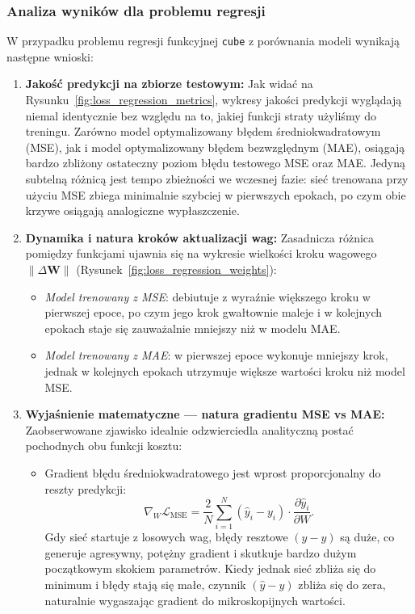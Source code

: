\documentclass[11pt,a4paper]{article}
\begin{document}
\subsubsection{Analiza wyników dla problemu regresji}
W przypadku problemu regresji funkcyjnej \texttt{cube} z porównania modeli wynikają następne wnioski:
\begin{enumerate}
    \item \textbf{Jakość predykcji na zbiorze testowym:} 
    Jak widać na Rysunku~\ref{fig:loss_regression_metrics}, wykresy jakości predykcji wyglądają niemal identycznie bez względu na to, jakiej funkcji straty użyliśmy do treningu. Zarówno model optymalizowany błędem średniokwadratowym (MSE), jak i model optymalizowany błędem bezwzględnym (MAE), osiągają bardzo zbliżony ostateczny poziom błędu testowego MSE oraz MAE. Jedyną subtelną różnicą jest tempo zbieżności we wczesnej fazie: sieć trenowana przy użyciu MSE zbiega minimalnie szybciej w pierwszych epokach, po czym obie krzywe osiągają analogiczne wypłaszczenie.

    \item \textbf{Dynamika i natura kroków aktualizacji wag:} 
    Zasadnicza różnica pomiędzy funkcjami ujawnia się na wykresie wielkości kroku wagowego $\|\Delta \mathbf{W}\|$ (Rysunek~\ref{fig:loss_regression_weights}):
    \begin{itemize}
        \item \emph{Model trenowany z MSE}: debiutuje z wyraźnie większego kroku w pierwszej epoce, po czym jego krok gwałtownie maleje i w kolejnych epokach staje się zauważalnie mniejszy niż w modelu MAE.
        \item \emph{Model trenowany z MAE}: w pierwszej epoce wykonuje mniejszy krok, jednak w kolejnych epokach utrzymuje większe wartości kroku niż model MSE.
    \end{itemize}

    \item \textbf{Wyjaśnienie matematyczne — natura gradientu MSE vs MAE:} 
    Zaobserwowane zjawisko idealnie odzwierciedla analityczną postać pochodnych obu funkcji kosztu:
    \begin{itemize}
        \item Gradient błędu średniokwadratowego jest wprost proporcjonalny do reszty predykcji:
        \begin{equation}
            \nabla_W \mathcal{L}_{\text{MSE}} = \frac{2}{N} \sum_{i=1}^N (\hat{y}_i - y_i) \cdot \frac{\partial \hat{y}_i}{\partial W}.
        \end{equation}
        Gdy sieć startuje z losowych wag, błędy resztowe $(\hat{y} - y)$ są duże, co generuje agresywny, potężny gradient i skutkuje bardzo dużym początkowym skokiem parametrów. Kiedy jednak sieć zbliża się do minimum i błędy stają się małe, czynnik $(\hat{y} - y)$ zbliża się do zera, naturalnie wygaszając gradient do mikroskopijnych wartości.
        

\end{itemize}
\end{enumerate}
\end{document}
